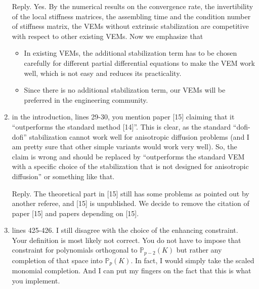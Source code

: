\documentclass[10pt]{amsart}
\theoremstyle{definition}
\theoremstyle{remark}
\begin{document}
\begin{enumerate}[1.]
\smallskip \noindent \textcolor[rgb]{1.00,0.00,0.00}{Reply.}
Yes. By the numerical results on the convergence rate, the invertibility of the local stiffness matrices, the assembling time and the condition number of stiffness
matrix,
the VEMs without extrinsic stabilization are competitive with respect to other existing VEMs.
Now we emphasize that
\begin{itemize}
\item
In existing VEMs, the additional stabilization term has to be chosen carefully for different partial differential equations to make the VEM work well, which is not easy and reduces its practicality.
\item 
Since there is no additional stabilization term, our VEMs will be preferred in the engineering community. 
\end{itemize}





\medskip

\item \textsf{in the introduction, lines 29-30, you mention paper [15] claiming that it ``outperforms the standard method [14]''. This is clear, as the standard ``dofi-dofi'' stabilization cannot work well for anisotropic diffusion problems (and I am pretty sure that other simple variants would work very well). So, the claim is wrong and should be replaced by ``outperforms the standard VEM with a specific choice of the stabilization that is not designed for anisotropic diffusion'' or something like that.}

\smallskip \noindent \textcolor[rgb]{1.00,0.00,0.00}{Reply.}
The theoretical part in [15] still has some problems as pointed out by another referee, and [15] is unpublished. We decide to remove the citation of paper [15] and papers depending on [15].


\medskip

\item \textsf{lines 425-426. I still disagree with the choice of the enhancing constraint. Your definition is most likely not correct. You do not have to impose that constraint for polynomials orthogonal to $\mathbb P_{p-2}(K)$ but rather any completion of that space into $\mathbb P_p(K)$. In fact, I would simply take the scaled monomial completion. And I can put my fingers on the fact that this is what you implement.}


\end{enumerate}
\end{document}
